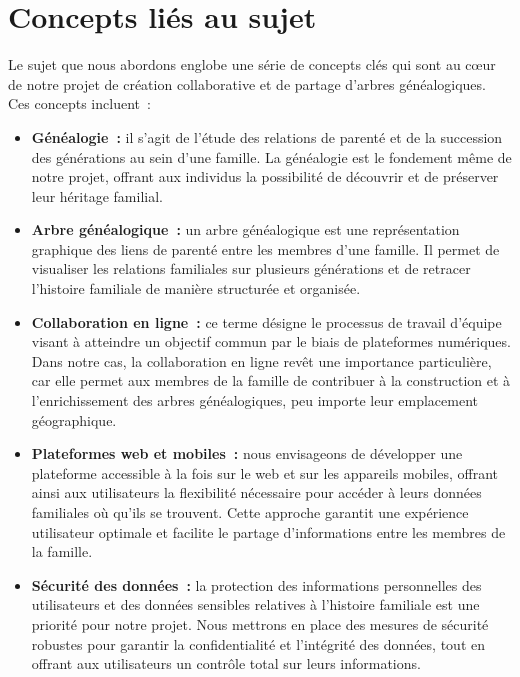 \section{Concepts liés au sujet}
Le sujet que nous abordons englobe une série de concepts clés qui sont au cœur
de notre projet de création collaborative et de partage d’arbres généalogiques.
Ces concepts incluent :
\begin{itemize}
  \item \textbf{Généalogie :} il s’agit de l’étude des relations de parenté et de la
    succession des générations au sein d’une famille. La généalogie est le
    fondement même de notre projet, offrant aux individus la possibilité de
    découvrir et de préserver leur héritage familial.

  \item \textbf{Arbre généalogique :} un arbre généalogique est une représentation graphique
    des liens de parenté entre les membres d’une famille. Il permet de visualiser
    les relations familiales sur plusieurs générations et de retracer l’histoire
    familiale de manière structurée et organisée.

  \item \textbf{Collaboration en ligne :} ce terme désigne le processus de travail d’équipe
    visant à atteindre un objectif commun par le biais de plateformes numériques.
    Dans notre cas, la collaboration en ligne revêt une importance particulière,
    car elle permet aux membres de la famille de contribuer à la construction et
    à l’enrichissement des arbres généalogiques, peu importe leur emplacement géographique.

  \item \textbf{Plateformes web et mobiles :} nous envisageons de développer une plateforme
    accessible à la fois sur le web et sur les appareils mobiles, offrant ainsi
    aux utilisateurs la flexibilité nécessaire pour accéder à leurs données
    familiales où qu’ils se trouvent. Cette approche garantit une expérience
    utilisateur optimale et facilite le partage d’informations entre les membres de la famille.

  \item \textbf{Sécurité des données :} la protection des informations personnelles des
    utilisateurs et des données sensibles relatives à l’histoire familiale est
    une priorité pour notre projet. Nous mettrons en place des mesures de sécurité
    robustes pour garantir la confidentialité et l’intégrité des données, tout en
    offrant aux utilisateurs un contrôle total sur leurs informations.


\end{itemize}
